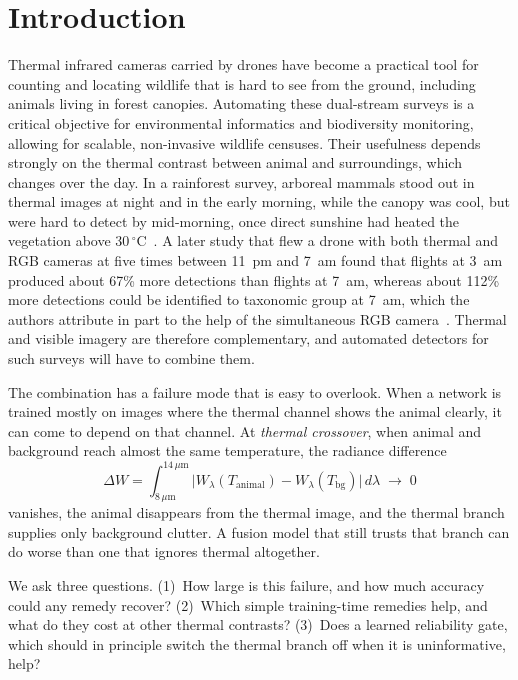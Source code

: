 \documentclass[runningheads]{llncs}
\begin{document}
\section{Introduction}
Thermal infrared cameras carried by drones have become a practical tool for counting and locating wildlife that is hard to see from the ground, including animals living in forest canopies. Automating these dual-stream surveys is a critical objective for environmental informatics and biodiversity monitoring, allowing for scalable, non-invasive wildlife censuses. Their usefulness depends strongly on the thermal contrast between animal and surroundings, which changes over the day. In a rainforest survey, arboreal mammals stood out in thermal images at night and in the early morning, while the canopy was cool, but were hard to detect by mid-morning, once direct sunshine had heated the vegetation above 30\,$^{\circ}$C~\cite{kays}. A later study that flew a drone with both thermal and RGB cameras at five times between 11~pm and 7~am found that flights at 3~am produced about 67\% more detections than flights at 7~am, whereas about 112\% more detections could be identified to taxonomic group at 7~am, which the authors attribute in part to the help of the simultaneous RGB camera~\cite{whitworth}. Thermal and visible imagery are therefore complementary, and automated detectors for such surveys will have to combine them.

The combination has a failure mode that is easy to overlook. When a network is trained mostly on images where the thermal channel shows the animal clearly, it can come to depend on that channel. At \emph{thermal crossover}, when animal and background reach almost the same temperature, the radiance difference
\begin{equation}
\Delta W=\int_{8\,\mu\mathrm{m}}^{14\,\mu\mathrm{m}}\bigl|W_\lambda(T_{\mathrm{animal}})-W_\lambda(T_{\mathrm{bg}})\bigr|\,d\lambda\;\longrightarrow\;0
\label{eq:cross}
\end{equation}
vanishes, the animal disappears from the thermal image, and the thermal branch supplies only background clutter. A fusion model that still trusts that branch can do worse than one that ignores thermal altogether.

We ask three questions. (1)~How large is this failure, and how much accuracy could any remedy recover? (2)~Which simple training-time remedies help, and what do they cost at other thermal contrasts? (3)~Does a learned reliability gate, which should in principle switch the thermal branch off when it is uninformative, help?
\end{document}
